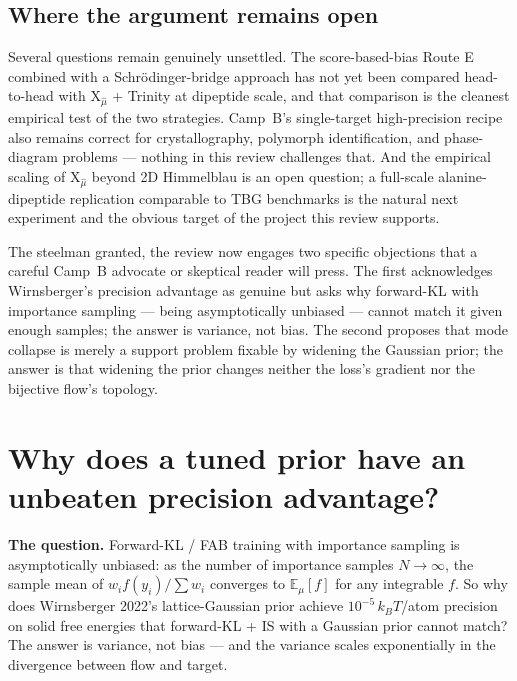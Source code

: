 \documentclass[11pt,letterpaper]{article}
\newcommand{\E}{\mathbb{E}}
\newcommand{\Xfun}{\mathrm{X}}
\theoremstyle{plain}
\begin{document}
\subsection{Where the argument remains open}

Several questions remain genuinely unsettled. The score-based-bias Route E
combined with a Schrödinger-bridge approach has not yet been compared
head-to-head with $\Xfun_{\hat\mu}$ + Trinity at dipeptide scale, and that
comparison is the cleanest empirical test of the two strategies. Camp~B's
single-target high-precision recipe also remains correct for crystallography,
polymorph identification, and phase-diagram problems --- nothing in this
review challenges that. And the empirical scaling of $\Xfun_{\hat\mu}$
beyond 2D Himmelblau is an open question; a full-scale alanine-dipeptide
replication comparable to TBG benchmarks is the natural next experiment and
the obvious target of the project this review supports.

The steelman granted, the review now engages two specific objections that a
careful Camp~B advocate or skeptical reader will press. The first
acknowledges Wirnsberger's precision advantage as genuine but asks why
forward-KL with importance sampling --- being asymptotically unbiased ---
cannot match it given enough samples; the answer is variance, not bias.
The second proposes that mode collapse is merely a support problem fixable
by widening the Gaussian prior; the answer is that widening the prior
changes neither the loss's gradient nor the bijective flow's topology.

\section{Why does a tuned prior have an unbeaten precision advantage?}\label{sec:precision-question}

\begin{callout}
\textbf{The question.} Forward-KL / FAB training with importance sampling is
asymptotically unbiased: as the number of importance samples $N\to\infty$, the
sample mean of $w_i f(y_i)/\sum w_i$ converges to $\E_\mu[f]$ for any
integrable $f$. So why does Wirnsberger 2022's lattice-Gaussian prior achieve
$10^{-5}\,k_B T$/atom precision on solid free energies that forward-KL + IS
with a Gaussian prior cannot match? The answer is variance, not bias --- and
the variance scales exponentially in the divergence between flow and target.
\end{callout}
\end{document}

